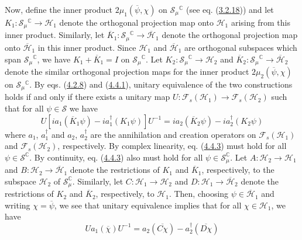 \documentclass[11pt,a4paper]{article}
\begin{document}
Now, define the inner product \(2\mu_1(\overline{\psi},\chi)\) on \(\mathcal{S}_\mu{}^\mathbb{C}\) (see eq. (\hyperref[eq:3.2.18]{3.2.18})) and let \(K_1:\mathcal{S}_\mu{}^\mathbb{C}\to\mathcal{H}_1\) denote the orthogonal projection map onto \(\mathcal{H}_1\) arising from this inner product. Similarly, let \(\overline{K}_1:\mathcal{S}_\mu{}^\mathbb{C}\to\overline{\mathcal{H}}_1\) denote the orthogonal projection map onto \(\overline{\mathcal{H}}_1\) in this inner product. Since \(\mathcal{H}_1\) and \(\overline{\mathcal{H}}_1\) are orthogonal subspaces which span \(\mathcal{S}_\mu{}^\mathbb{C}\), we have \(K_1+\overline{K}_1=I\) on \(\mathcal{S}_\mu{}^\mathbb{C}\). Let \(K_2:\mathcal{S}_\mu{}^\mathbb{C}\to\mathcal{H}_2\) and \(\overline{K}_2:\mathcal{S}_\mu{}^\mathbb{C}\to\overline{\mathcal{H}}_2\) denote the similar orthogonal projection maps for the inner product \(2\mu_2(\overline{\psi},\chi)\) on \(\mathcal{S}_\mu{}^\mathbb{C}\). By eqs. (\hyperref[eq:4.2.8]{4.2.8}) and (\hyperref[eq:4.4.1]{4.4.1}), unitary equivalence of the two constructions holds if and only if there exists a unitary map \(U:\mathcal{F}_s(\mathcal{H}_1)\to\mathcal{F}_s(\mathcal{H}_2)\) such that for all \(\psi\in\mathcal{S}\) we have
\begin{equation*}
U[ia_{1}(\overline{K}_{1}\psi) - ia_{1}^{\dagger}(K_{1}\psi)] U^{-1} = ia_{2}(\overline{K}_{2}\psi) - ia_{2}^{\dagger}(K_{2}\psi) \tag{4.4.3}\label{eq:4.4.3}
\end{equation*}
where \(a_1\), \(a_1^{\dagger}\) and \(a_2\), \(a_2^{\dagger}\) are the annihilation and creation operators \hypertarget{source-81}{} on \(\mathcal{F}_s(\mathcal{H}_1)\) and \(\mathcal{F}_s(\mathcal{H}_2)\), respectively. By complex linearity, eq. (\hyperref[eq:4.4.3]{4.4.3}) must hold for all \(\psi \in \mathcal{S}^{\mathbb{C}}\). By continuity, eq. (\hyperref[eq:4.4.3]{4.4.3}) also must hold for all \(\psi \in \mathcal{S}_{\mu}^{\mathbb{C}}\). Let \(A:\mathcal{H}_2 \to \mathcal{H}_1\) and \(B:\mathcal{H}_2 \to \overline{\mathcal{H}}_1\) denote the restrictions of \(K_1\) and \(\overline{K}_1\), respectively, to the subspace \(\mathcal{H}_2\) of \(\mathcal{S}_{\mu}^{\mathbb{C}}\). Similarly, let \(C:\mathcal{H}_1 \to \mathcal{H}_2\) and \(D:\mathcal{H}_1 \to \overline{\mathcal{H}}_2\) denote the restrictions of \(K_2\) and \(\overline{K}_2\), respectively, to \(\mathcal{H}_1\). Then, choosing \(\psi \in \overline{\mathcal{H}}_1\) and writing \(\chi = \overline{\psi}\), we see that unitary equivalence implies that for all \(\chi \in \mathcal{H}_1\), we have
\begin{equation*}
Ua_{1}(\overline{\chi})U^{-1} = a_{2}(\overline{C\chi}) - a_{2}^{\dagger}(\overline{D\chi}) \tag{4.4.4}\label{eq:4.4.4}
\end{equation*}
\end{document}
